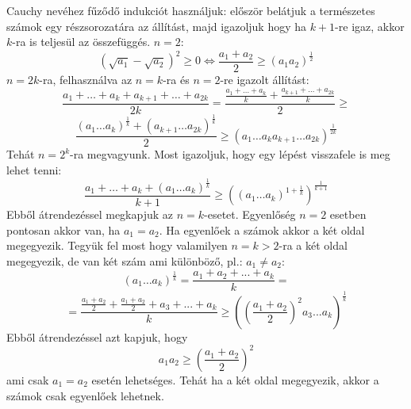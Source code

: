   Cauchy nevéhez fűződő indukciót használjuk: először belátjuk a 
   természetes számok egy részsorozatára az állítást, majd igazoljuk hogy 
   ha $k+1$-re igaz, akkor $k$-ra is teljesül az összefüggés. 
   $n=2$:
   $$
   (\sqrt{a_{1}}-\sqrt{a_{2}})^2 \ge 0 \Longleftrightarrow 
   \frac{a_{1}+a_{2}}{2} \ge {(a_{1}a_{2})}^{\frac{1}{2}}
   $$
   $n=2k$-ra, felhasználva az $n=k$-ra és $n=2$-re igazolt állítást:
   $$
   \frac{a_{1}+\hdots+a_{k}+a_{k+1}+\hdots+a_{2k}}{2k} =
   \frac{\frac{a_{1}+\hdots+a_{k}}{k}+\frac{a_{k+1}+\hdots+a_{2k}}{k}}{2} \ge
   $$
   $$
   \frac{{(a_{1}\hdots a_{k})}^{\frac{1}{k}}+{(a_{k+1}\hdots a_{2k})}^{\frac{1}{k}}}{2}\ge
   {(a_{1}\hdots a_{k}a_{k+1}\hdots a_{2k})}^{\frac{1}{2k}}
   $$
   Tehát $n=2^k$-ra megvagyunk.
   \newline
   Most igazoljuk, hogy egy lépést visszafele is meg lehet tenni:
   $$
   \frac{a_{1}+\hdots+a_{k}+{(a_{1}\hdots a_{k})}^{\frac{1}{k}}}{k+1} \ge
   {\left( {(a_{1}\hdots a_{k})}^{1+\frac{1}{k}}\right) }^{\frac{1}{k+1}}
   $$
   Ebből átrendezéssel megkapjuk az $n=k$-esetet. 
   \newline
   Egyenlőség $n=2$ esetben pontosan akkor van, ha $a_{1}=a_{2}$. Ha 
   egyenlőek a számok akkor a két oldal megegyezik.
   Tegyük fel most hogy valamilyen $n=k>2$-ra a két oldal megegyezik, de van 
   két szám ami különböző, pl.: $a_{1} \neq a_{2}$:
   $$
   {(a_{1}\hdots a_{k})}^{\frac{1}{k}}=\frac{a_{1}+a_{2}+...+a_{k}}{k}=
   $$
   $$
   =\frac{\frac{a_{1}+a_{2}}{2}+\frac{a_{1}+a_{2}}{2}+a_{3}+...+a_{k}}{k} \ge
   {\left( {\left( \frac{a_{1}+a_{2}}{2}\right)}^2 a_{3}...a_{k} \right) }^{\frac{1}{k}} 
   $$
   Ebből átrendezéssel azt kapjuk, hogy 
   $$
   a_{1}a_{2} \ge {\left( \frac{a_{1}+a_{2}}{2}\right) }^2
   $$
   ami csak $a_{1}=a_{2}$ esetén lehetséges. Tehát ha a két oldal megegyezik, akkor a számok
   csak egyenlőek lehetnek.
